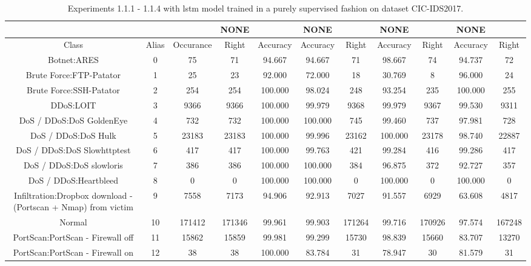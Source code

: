 \begin{table}[htb]
    \centering
    \caption{Experiments 1.1.1 - 1.1.4 with \gls{lstm} model trained in a purely supervised fashion on dataset CIC-IDS2017.}
    \label{table:results:lstm:flows_supervised}
    \begin{tabular}{@{}ccccccccccc@{}}
        \toprule
         &  &  & NONE &  & NONE &  & NONE &  & NONE &  \\
        \midrule
        Class &  Alias &  Occurance &  Right &  Accuracy &  Accuracy &  Right &  Accuracy &  Right &  Accuracy &  Right \\
        Botnet:ARES &  0 &  75 &  71 &  94.667 &  94.667 &  71 &  98.667 &  74 &  94.737 &  72 \\
        Brute Force:FTP-Patator &  1 &  25 &  23 &  92.000 &  72.000 &  18 &  30.769 &  8 &  96.000 &  24 \\
        Brute Force:SSH-Patator &  2 &  254 &  254 &  100.000 &  98.024 &  248 &  93.254 &  235 &  100.000 &  255 \\
        DDoS:LOIT &  3 &  9366 &  9366 &  100.000 &  99.979 &  9368 &  99.979 &  9367 &  99.530 &  9311 \\
        DoS / DDoS:DoS GoldenEye &  4 &  732 &  732 &  100.000 &  100.000 &  745 &  99.460 &  737 &  97.981 &  728 \\
        DoS / DDoS:DoS Hulk &  5 &  23183 &  23183 &  100.000 &  99.996 &  23162 &  100.000 &  23178 &  98.740 &  22887 \\
        DoS / DDoS:DoS Slowhttptest &  6 &  417 &  417 &  100.000 &  99.763 &  421 &  99.284 &  416 &  99.286 &  417 \\
        DoS / DDoS:DoS slowloris &  7 &  386 &  386 &  100.000 &  100.000 &  384 &  96.875 &  372 &  92.727 &  357 \\
        DoS / DDoS:Heartbleed &  8 &  0 &  0 &  100.000 &  100.000 &  0 &  100.000 &  0 &  100.000 &  0 \\
        Infiltration:Dropbox download - (Portscan + Nmap) from victim &  9 &  7558 &  7173 &  94.906 &  92.913 &  7027 &  91.557 &  6929 &  63.608 &  4817 \\
        Normal &  10 &  171412 &  171346 &  99.961 &  99.903 &  171264 &  99.716 &  170926 &  97.574 &  167248 \\
        PortScan:PortScan - Firewall off &  11 &  15862 &  15859 &  99.981 &  99.299 &  15730 &  98.839 &  15660 &  83.707 &  13270 \\
        PortScan:PortScan - Firewall on &  12 &  38 &  38 &  100.000 &  83.784 &  31 &  78.947 &  30 &  81.579 &  31 \\

\end{tabular}
\end{table}
